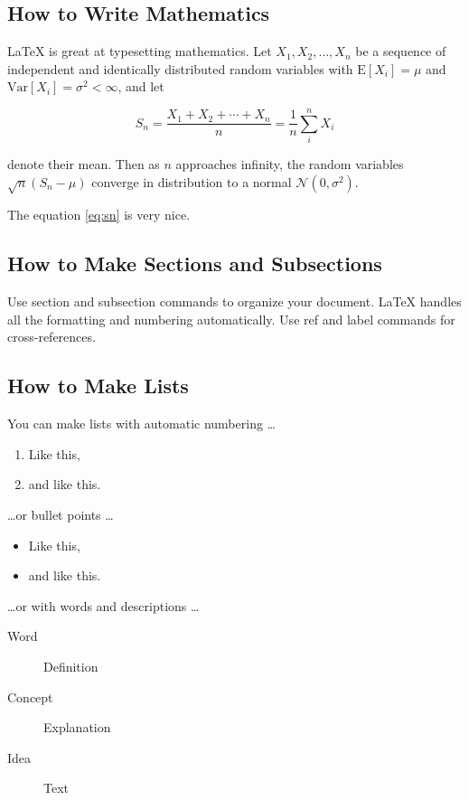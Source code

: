 \documentclass[a4paper]{article}
\begin{document}
\subsection{How to Write Mathematics}

\LaTeX{} is great at typesetting mathematics. Let $X_1, X_2, \ldots, X_n$ be a sequence of independent and identically distributed random variables with $\text{E}[X_i] = \mu$ and $\text{Var}[X_i] = \sigma^2 < \infty$, and let

\begin{equation}
S_n = \frac{X_1 + X_2 + \cdots + X_n}{n}
      = \frac{1}{n}\sum_{i}^{n} X_i
\label{eq:sn}
\end{equation}

denote their mean. Then as $n$ approaches infinity, the random variables $\sqrt{n}(S_n - \mu)$ converge in distribution to a normal $\mathcal{N}(0, \sigma^2)$.

The equation \ref{eq:sn} is very nice.

\subsection{How to Make Sections and Subsections}

Use section and subsection commands to organize your document. \LaTeX{} handles all the formatting and numbering automatically. Use ref and label commands for cross-references.

\subsection{How to Make Lists}

You can make lists with automatic numbering \dots

\begin{enumerate}
\item Like this,
\item and like this.
\end{enumerate}
\dots or bullet points \dots
\begin{itemize}
\item Like this,
\item and like this.
\end{itemize}
\dots or with words and descriptions \dots
\begin{description}
\item[Word] Definition
\item[Concept] Explanation
\item[Idea] Text
\end{description}
\end{document}
